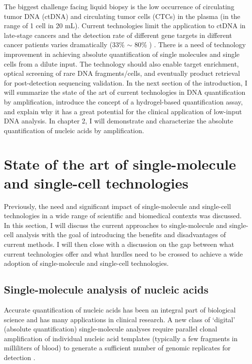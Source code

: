 The biggest challenge facing liquid biopsy is the low occurrence of circulating tumor DNA (ctDNA) and circulating tumor cells (CTCs) in the plasma (in the range of 1 cell in 20 mL). 
Current technologies limit the application to ctDNA in late-stage cancers and the detection rate of different gene targets in different cancer patients varies dramatically (33\% $\sim$ 80\% ) \cite{Esteller:1999tq}. There is a need of technology improvement in achieving absolute quantification of single molecules and single cells from a dilute input. The technology should also enable target enrichment, optical screening of rare DNA fragments/cells, and eventually product retrieval for post-detection sequencing validation. In the next section of the introduction, I will summarize the state of the art of current technologies in DNA quantification by amplification, introduce the concept of a hydrogel-based quantification assay, and explain why it has a great potential for the clinical application of low-input DNA analysis. In chapter 2, I will demonstrate and characterize the absolute quantification of nucleic acids by amplification. 
\section{State of the art of single-molecule and single-cell technologies}
Previously, the need and significant impact of single-molecule and single-cell technologies in a wide range of scientific and biomedical contexts was discussed. In this section, I will discuss the current approaches to single-molecule and single-cell analysis with the goal of introducing the benefits and disadvantages of current methods. I will then close with a discussion on the gap between what current technologies offer and what hurdles need to be crossed to achieve a wide adoption of single-molecule and single-cell technologies. 

\subsection{Single-molecule analysis of nucleic acids}
Accurate quantification of nucleic acids has been an integral part of biological science and has many applications in clinical research. A new class of `digital' (absolute quantification) single-molecule analyses require parallel clonal amplification of individual nucleic acid templates (typically a few fragments in milliliters of blood) to generate a sufficient number of genomic replicates for detection \cite{Zou:2017dq,Jennings:2014et,Lun:2008cp,Cochran:2014cn,Lo:2007hb,Vogelstain:1999ve,Sykes:1992tm}. 

